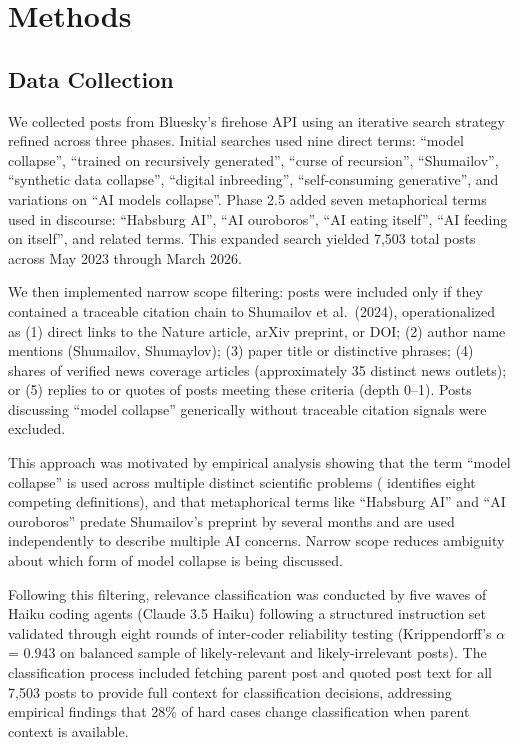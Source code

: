 \documentclass[twocolumn,11pt]{article}
\begin{document}
\section{Methods}

\subsection{Data Collection}

We collected posts from Bluesky's firehose API using an iterative search strategy refined across three phases. Initial searches used nine direct terms: ``model collapse'', ``trained on recursively generated'', ``curse of recursion'', ``Shumailov'', ``synthetic data collapse'', ``digital inbreeding'', ``self-consuming generative'', and variations on ``AI models collapse''. Phase 2.5 added seven metaphorical terms used in discourse: ``Habsburg AI'', ``AI ouroboros'', ``AI eating itself'', ``AI feeding on itself'', and related terms. This expanded search yielded 7,503 total posts across May 2023 through March 2026.

We then implemented narrow scope filtering: posts were included only if they contained a traceable citation chain to Shumailov et al.\ (2024), operationalized as (1) direct links to the Nature article, arXiv preprint, or DOI; (2) author name mentions (Shumailov, Shumaylov); (3) paper title or distinctive phrases; (4) shares of verified news coverage articles (approximately 35 distinct news outlets); or (5) replies to or quotes of posts meeting these criteria (depth 0--1). Posts discussing ``model collapse'' generically without traceable citation signals were excluded.

This approach was motivated by empirical analysis showing that the term ``model collapse'' is used across multiple distinct scientific problems (\cite{Schaeffer2025} identifies eight competing definitions), and that metaphorical terms like ``Habsburg AI'' and ``AI ouroboros'' predate Shumailov's preprint by several months and are used independently to describe multiple AI concerns. Narrow scope reduces ambiguity about which form of model collapse is being discussed.

Following this filtering, relevance classification was conducted by five waves of Haiku coding agents (Claude 3.5 Haiku) following a structured instruction set validated through eight rounds of inter-coder reliability testing (Krippendorff's $\alpha$ = 0.943 on balanced sample of likely-relevant and likely-irrelevant posts). The classification process included fetching parent post and quoted post text for all 7,503 posts to provide full context for classification decisions, addressing empirical findings that 28\% of hard cases change classification when parent context is available.
\end{document}
